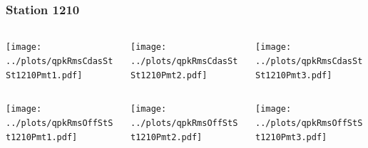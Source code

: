 \documentclass[aspectratio=169]{beamer}
\begin{document}
\begin{frame} 
  \frametitle{Station 1210}
  \begin{center}
    \begin{columns}
      \begin{column}{0.33\textwidth}
        \texttt{[image: ../plots/qpkRmsCdasStSt1210Pmt1.pdf]}
      \end{column}
      \begin{column}{0.33\textwidth}
        \texttt{[image: ../plots/qpkRmsCdasStSt1210Pmt2.pdf]}
      \end{column}
      \begin{column}{0.33\textwidth}
        \texttt{[image: ../plots/qpkRmsCdasStSt1210Pmt3.pdf]}
      \end{column}
    \end{columns}
  \end{center}

  \begin{center}
    \begin{columns}
      \begin{column}{0.33\textwidth}
        \texttt{[image: ../plots/qpkRmsOffStSt1210Pmt1.pdf]}
      \end{column}
      \begin{column}{0.33\textwidth}
        \texttt{[image: ../plots/qpkRmsOffStSt1210Pmt2.pdf]}
      \end{column}
      \begin{column}{0.33\textwidth}
        \texttt{[image: ../plots/qpkRmsOffStSt1210Pmt3.pdf]}
      \end{column}
    \end{columns}
  \end{center}
\end{frame}
\end{document}
